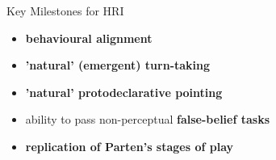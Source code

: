 \documentclass[compress]{beamer}
\begin{document}
\begin{frame}{Key Milestones for HRI}

    \begin{itemize}

        \item {\bf behavioural alignment}


        \item {\bf 'natural' (\ie emergent) turn-taking}

        \item {\bf 'natural' protodeclarative pointing}

        \item ability to pass non-perceptual {\bf false-belief tasks}

        \item {\bf replication of Parten's stages of play}


    \end{itemize}

\end{frame}

\end{document}
